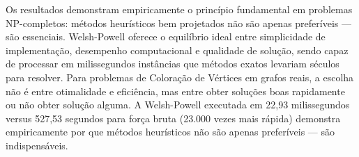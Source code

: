 \documentclass[12pt]{article}
\begin{document}
Os resultados demonstram empiricamente o princípio fundamental em problemas NP-completos: métodos heurísticos bem projetados não são apenas preferíveis — são essenciais. Welsh-Powell oferece o equilíbrio ideal entre simplicidade de implementação, desempenho computacional e qualidade de solução, sendo capaz de processar em milissegundos instâncias que métodos exatos levariam séculos para resolver. Para problemas de Coloração de Vértices em grafos reais, a escolha não é entre otimalidade e eficiência, mas entre obter soluções boas rapidamente ou não obter solução alguma. A Welsh-Powell executada em 22,93 milissegundos versus 527,53 segundos para força bruta (23.000 vezes mais rápida) demonstra empiricamente por que métodos heurísticos não são apenas preferíveis — são indispensáveis.
\newpage
\nocite{*}


\end{document}

